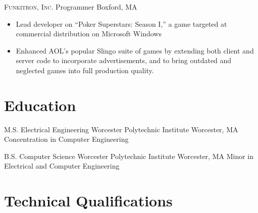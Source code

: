 \documentclass[11pt,letterpaper,roman]{moderncv} %
\begin{document}
		{\textsc{Funkitron, Inc.}}				{Programmer}							{Boxford, MA}		{}
	{
	\begin{itemize}
		\item Lead developer on ``Poker Superstars: Season I,'' a game targeted at commercial distribution on Microsoft Windows
		\item Enhanced AOL's popular Slingo suite of games by extending both client and server code to incorporate advertisements, and to bring outdated and neglected games into full production quality.
	\end{itemize}
	}



\section{Education}

		{M.S. Electrical Engineering}	{Worcester Polytechnic Institute}	{Worcester, MA}		{}
	{
		Concentration in Computer Engineering
	}

		{B.S. Computer Science}			{Worcester Polytechnic Institute}	{Worcester, MA}		{}
	{
		Minor in Electrical and Computer Engineering
	}

%
%


\section{Technical Qualifications}
\end{document}

